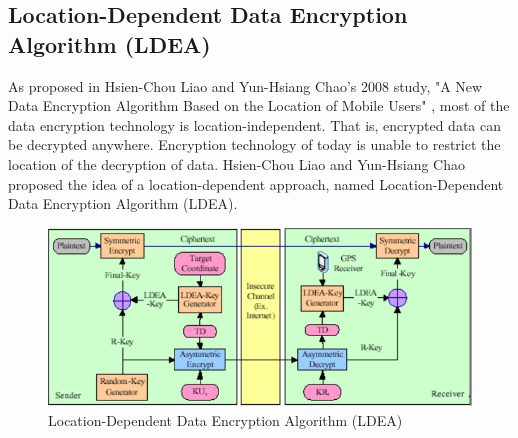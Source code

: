 \documentclass[journal]{IEEEtran}
\begin{document}
\subsection{\textbf{Location-Dependent Data Encryption Algorithm (LDEA)}}
As proposed in Hsien-Chou Liao and Yun-Hsiang Chao's 2008 study, "A New Data Encryption Algorithm Based on the Location of Mobile
Users" \cite{new_encryption_mobile}, most of the data encryption technology is location-independent. That is, encrypted data can be decrypted anywhere. Encryption technology of today is unable to restrict the location of the decryption of data. Hsien-Chou Liao and Yun-Hsiang Chao proposed the idea of a location-dependent approach, named Location-Dependent Data Encryption Algorithm (LDEA). 

\newline
\begin{figure}[!h]
    \centering
    \includegraphics[scale=.6]{ldea}
    \caption{Location-Dependent Data Encryption Algorithm (LDEA)}
    \label{fig:ldea}
\end{figure}
\end{document}

